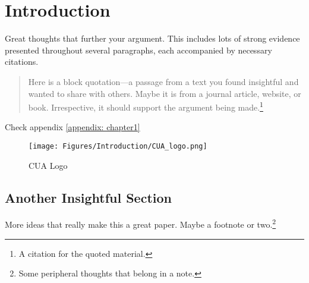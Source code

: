 \chapter{Introduction}
\label{chapter:introduction}


Great thoughts that further your argument. This includes lots of strong evidence presented throughout several paragraphs, each accompanied by necessary citations.
\begin{quotation}
    \noindent Here is a block quotation---a passage from a text you found insightful and wanted to share with others. Maybe it is from a journal article, website, or book. Irrespective, it should support the argument being made.\footnote{A citation for the quoted material.}
\end{quotation}


Check appendix \ref{appendix: chapter1}

\begin{figure} [ht]
\centering
         \texttt{[image: Figures/Introduction/CUA\_logo.png]}
         \caption{CUA Logo}
         \label{CUA-logo-1}
\end{figure}


\section{Another Insightful Section}
\label{section:another_interesting_section}

More ideas that really make this a great paper. Maybe a footnote or two.\footnote{Some peripheral thoughts that belong in a note.}
